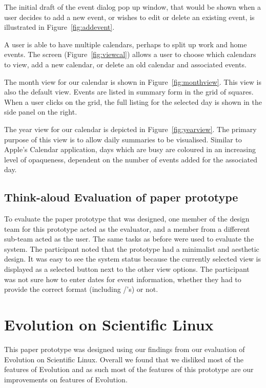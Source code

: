 \documentclass{article}
\begin{document}
The initial draft of the event dialog pop up window, that would be
shown when a user decides to add a new event, or wishes to edit or
delete an existing event, is illustrated in Figure~\ref{fig:addevent}.

A user is able to have multiple calendars, perhaps to split up work and
home events. The screen (Figure~\ref{fig:viewcal}) allows a user to
choose which calendars to view, add a new calendar, or delete an old
calendar and associated events.

The month view for our calendar is shown in Figure~\ref{fig:monthview}.
This view is also the default view. Events are listed in summary form
in the grid of squares. When a user clicks on the grid, the full listing
for the selected day is shown in the side panel on the right.

The year view for our calendar is depicted in Figure~\ref{fig:yearview}.
The primary purpose of this view is to allow daily summaries to be
visualised. Similar to Apple's Calendar application, days which are
busy are coloured in an increasing level of opaqueness, dependent on
the number of events added for the associated day.

\subsection{Think-aloud Evaluation of paper prototype}

To evaluate the paper prototype that was designed, one member of the
design team for this prototype acted as the evaluator, and a member
from a different sub-team acted as the user. The same tasks as before
were used to evaluate the system. The participant noted that the
prototype had a minimalist and aesthetic design. It was easy to see the
system status because the currently selected view is displayed as a
selected button next to the other view options. The participant was not
sure how to enter dates for event information, whether they had to
provide the correct format (including /'s) or not.


\section{Evolution on Scientific Linux}

This paper prototype was designed using our findings from our evaluation 
of Evolution on Scientific Linux. Overall we found that we disliked most
of the features of Evolution and as such most of the features of this
prototype are our improvements on features of Evolution.
\end{document}
